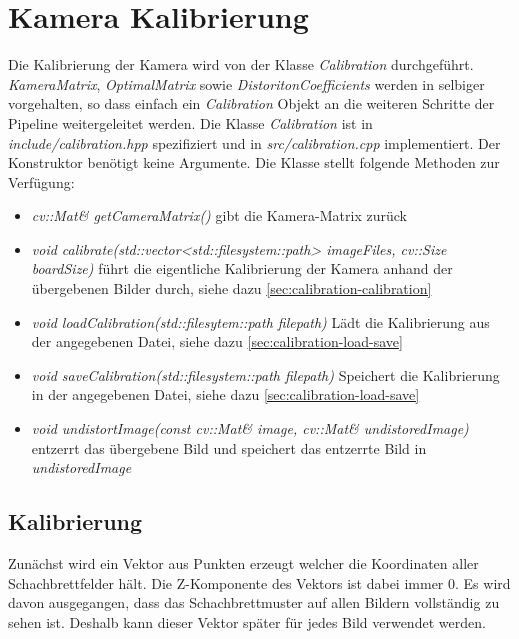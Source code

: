 \section{Kamera Kalibrierung}\label{sec:implementation-calibration}
Die Kalibrierung der Kamera wird von der Klasse \emph{Calibration} durchgeführt.
\emph{KameraMatrix}, \emph{OptimalMatrix} sowie \emph{DistoritonCoefficients} werden in selbiger vorgehalten, so dass einfach ein \emph{Calibration} Objekt an die weiteren Schritte der Pipeline weitergeleitet werden.
Die Klasse \emph{Calibration} ist in \emph{include/calibration.hpp} spezifiziert und in \emph{src/calibration.cpp} implementiert.
Der Konstruktor benötigt keine Argumente.
Die Klasse stellt folgende Methoden zur Verfügung:
\begin{itemize}
\item \emph{cv::Mat\& getCameraMatrix()} gibt die Kamera-Matrix zurück
\item \emph{void calibrate(std::vector<std::filesystem::path> imageFiles, cv::Size boardSize)} führt die eigentliche Kalibrierung der Kamera anhand der übergebenen Bilder durch, siehe dazu \autoref{sec:calibration-calibration}
\item \emph{void loadCalibration(std::filesytem::path filepath)} Lädt die Kalibrierung aus der angegebenen Datei, siehe dazu \autoref{sec:calibration-load-save}
\item \emph{void saveCalibration(std::filesystem::path filepath)} Speichert die Kalibrierung in der angegebenen Datei, siehe dazu \autoref{sec:calibration-load-save}
\item \emph{void undistortImage(const cv::Mat\& image, cv::Mat\& undistoredImage)} entzerrt das übergebene Bild und speichert das entzerrte Bild in \emph{undistoredImage}
\end{itemize}

\subsection{Kalibrierung}\label{sec:calibration-calibration}
Zunächst wird ein Vektor aus Punkten erzeugt welcher die Koordinaten aller Schachbrettfelder hält.
Die Z-Komponente des Vektors ist dabei immer 0.
Es wird davon ausgegangen, dass das Schachbrettmuster auf allen Bildern vollständig zu sehen ist.
Deshalb kann dieser Vektor später für jedes Bild verwendet werden.

